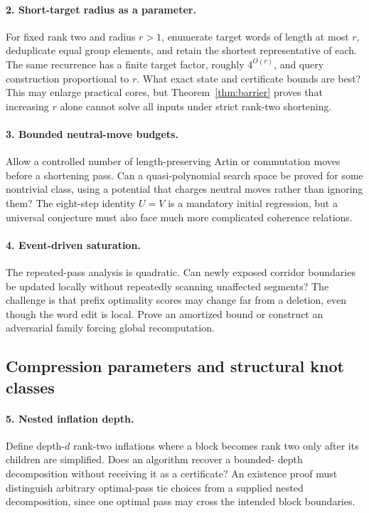 \documentclass[11pt]{article}
\theoremstyle{definition}
\theoremstyle{remark}
\begin{document}
\paragraph{2. Short-target radius as a parameter.}
For fixed rank two and radius $r>1$, enumerate target words of length at
most $r$, deduplicate equal group elements, and retain the shortest
representative of each. The same recurrence has a finite target factor,
roughly $4^{O(r)}$, and query construction proportional to $r$. What exact
state and certificate bounds are best? This may enlarge practical cores,
but Theorem~\ref{thm:barrier} proves that increasing $r$ alone cannot solve
all inputs under strict rank-two shortening.

\paragraph{3. Bounded neutral-move budgets.}
Allow a controlled number of length-preserving Artin or commutation moves
before a shortening pass. Can a quasi-polynomial search space be proved for
some nontrivial class, using a potential that charges neutral moves rather
than ignoring them? The eight-step identity $U=V$ is a mandatory initial
regression, but a universal conjecture must also face much more complicated
coherence relations.

\paragraph{4. Event-driven saturation.}
The repeated-pass analysis is quadratic. Can newly exposed corridor
boundaries be updated locally without repeatedly scanning unaffected
segments? The challenge is that prefix optimality scores may change far
from a deletion, even though the word edit is local. Prove an amortized
bound or construct an adversarial family forcing global recomputation.

\subsection{Compression parameters and structural knot classes}
\paragraph{5. Nested inflation depth.}
Define depth-$d$ rank-two inflations where a block becomes rank two only
after its children are simplified. Does an algorithm recover a bounded-
depth decomposition without receiving it as a certificate? An existence
proof must distinguish arbitrary optimal-pass tie choices from a supplied
nested decomposition, since one optimal pass may cross the intended
block boundaries.
\end{document}
